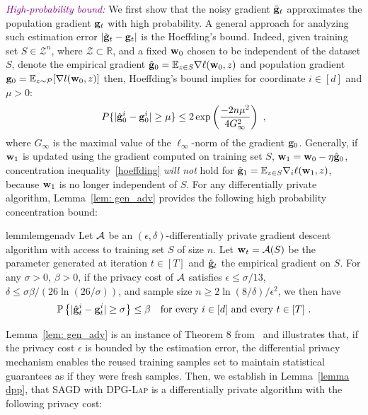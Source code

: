 \documentclass[11pt]{article}
\begin{document}
\textcolor{purple}{\textit{High-probability bound:}}
We first show that the noisy gradient $\tilde {\mathbf{g}}_t$ approximates the population gradient $\mathbf{g}_t$ with high probability.
A general approach for analyzing such estimation error $| \tilde {\mathbf{g}}_t - \mathbf{g}_t|$ is the Hoeffding's bound. 
Indeed, given training set $S \in \mathcal{Z}^n$, where $\mathcal{Z} \subset \mathbb{R}$, and a fixed $\mathbf{w}_0$ chosen to be independent of the dataset $S$, denote the empirical gradient $\hat {\mathbf{g}}_0= \mathbb{E}_{z \in S}\nabla \ell(\mathbf{w}_0,z)$ and population gradient $\mathbf{g}_0 = \mathbb{E}_{z\sim \mathcal{P}}[\nabla l(\mathbf{w}_0,z)]$ then, Hoeffding's bound implies for coordinate $i \in [d]$ and $\mu > 0$:
\begin{equation} \label{hoeffding}
P\{|\hat {\mathbf{g}}^i_0 - \mathbf{g}_0^i | \geq \mu \} \leq2 \exp \left(\frac{-2n\mu^2}{4G_\infty^2} \right)~,
\end{equation}
 where $G_\infty$ is the maximal value of the $\ell_\infty$-norm of the gradient $ \mathbf{g}_0$. 
Generally, if $\mathbf{w}_1$ is updated using the gradient computed on training set $S$, \ie $\mathbf{w}_1 = \mathbf{w}_0 - \eta \hat {\mathbf{g}}_0$, concentration inequality~\eqref{hoeffding} \emph{will not} hold for $\hat {\mathbf{g}}_1 = \mathbb{E}_{z \in S}\nabla_i \ell(\mathbf{w}_1,z)$, because $\mathbf{w}_1$ is no longer independent of $S$. 
For any differentially private algorithm, Lemma~\ref{lem: gen_adv} provides the following high probability concentration bound:  
\begin{restatable}{lemm}{lemgenadv}
\label{lem: gen_adv}
	Let $\cA$ be an $(\epsilon, \delta)$-differentially private gradient descent algorithm with access to training set $S$ of size $n$. Let $\w_t = \cA(S)$ be the parameter generated at iteration $t \in [T]$ and $\hat {\mathbf{g}}_t$ the empirical gradient on $S$. For any $\sigma >0$, $\beta > 0$, if the privacy cost of $\cA$ satisfies $\epsilon \leq \sigma/13$, $\delta \leq \sigma \beta/(26 \ln(26/\sigma))$, and sample size $n \geq 2\ln(8/\delta)/\epsilon^2$, we then have
	\begin{equation*}
	\mathbb{P}\left\{ |\hat {\mathbf{g}}_t^i - \mathbf{g}_t^i| \geq  \sigma \right\} \leq \beta \quad \textrm{for every $ i\in [d]$ and every $t \in [T]$} ~.
	\end{equation*} 
\end{restatable}
Lemma~\ref{lem: gen_adv} is an instance of Theorem 8 from~\cite{dwfe2015a} and illustrates that, if the privacy cost $\epsilon$ is bounded by the estimation error, the differential privacy mechanism enables the reused training samples set to maintain statistical guarantees as if they were fresh samples. 
Then, we establish in Lemma~\ref{lemma dpp}, that \textsc{SAGD} with \textsc{DPG-Lap} is a differentially private algorithm with the following privacy cost:
\end{document}
